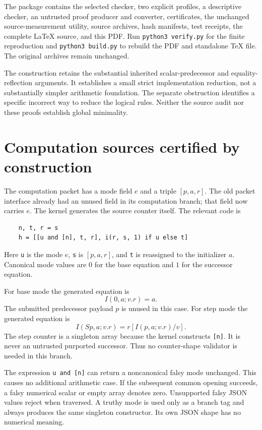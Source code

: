 \documentclass[11pt,letterpaper]{article}
\theoremstyle{definition}\newtheorem{definition}[theorem]{Definition}
\theoremstyle{remark}\newtheorem{remark}[theorem]{Remark}
\begin{document}
The package contains the selected checker, two explicit profiles, a
descriptive checker, an untrusted proof producer and converter,
certificates, the unchanged source-measurement utility, source archives,
hash manifests, test receipts, the complete LaTeX source, and this PDF.
Run \texttt{python3 verify.py} for the finite reproduction and
\texttt{python3 build.py} to rebuild the PDF and standalone TeX file.
The original archives remain unchanged.

The construction retains the substantial inherited scalar-predecessor
and equality-reflection arguments. It establishes a small strict
implementation reduction, not a substantially simpler arithmetic
foundation. The separate obstruction identifies a specific incorrect
way to reduce the logical rules. Neither the source audit nor these
proofs establish global minimality.

\appendix
\section{Computation sources certified by construction}
\label{sec:constructed-supply-audit}

The computation packet has a mode field $e$ and a triple $[p,a,r]$.
The old packet interface already had an unused field in its computation
branch; that field now carries $e$.  The kernel generates the source
counter itself.  The relevant code is
\begin{verbatim}
    n, t, r = s
    h = [[u and [n], t, r], i(r, s, 1) if u else t]
\end{verbatim}
Here \texttt{u} is the mode $e$, \texttt{s} is $[p,a,r]$, and
\texttt{t} is reassigned to the initializer $a$.  Canonical mode values
are $0$ for the base equation and $1$ for the successor equation.

For base mode the generated equation is
\[
                 I(0,a;v.r)=a.
\]
The submitted predecessor payload $p$ is unused in this case.  For step
mode the generated equation is
\[
                 I(Sp,a;v.r)=r[I(p,a;v.r)/v].
\]
The step counter is a singleton array because the kernel constructs
\texttt{[n]}.  It is never an untrusted purported successor.  Thus no
counter-shape validator is needed in this branch.

The expression \texttt{u and [n]} can return a noncanonical falsy mode
unchanged.  This causes no additional arithmetic case.  If the subsequent
common opening succeeds, a falsy numerical scalar or empty array denotes
zero.  Unsupported falsy JSON values reject when traversed.  A truthy
mode is used only as a branch tag and always produces the same singleton
constructor.  Its own JSON shape has no numerical meaning.
\end{document}
